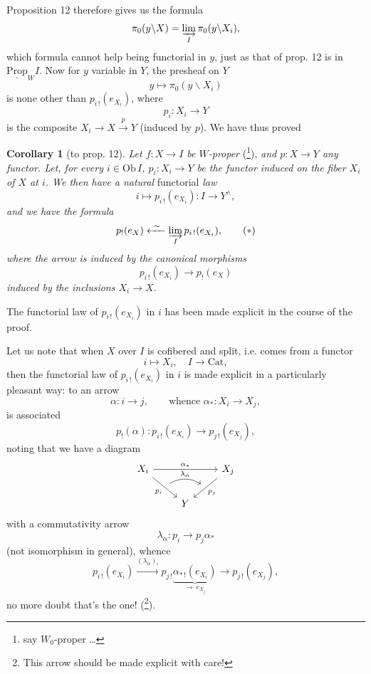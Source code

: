 \documentclass[11pt]{article}
\newcommand{\printedpage}[1]{\marginpar{\footnotesize p.~#1}}
\newcommand{\msp}[1]{\marginpar{\footnotesize [#1]}}
\begin{document}
\msp{page 118}
Proposition 12 therefore gives us the formula
\[
\pi_0(y\backslash X) = \varinjlim_{I} \pi_0(y\backslash X_i),
\]
which formula cannot help being functorial in $y$, just as that of prop. 12 is in $\underline{\mathrm{Prop}}_W I$. Now for $y$ variable in $Y$, the presheaf on $Y$
\[
y \longmapsto \pi_0(y\backslash X_i)
\]
is none other than $p_{i\,!}(e_{X_i})$, where
\[
p_i : X_i \longrightarrow Y
\]
is the composite $X_i \longrightarrow X \xrightarrow{p} Y$ (induced by $p$). We have thus proved

\textbf{Corollary 1} (to prop. 12). \textit{Let $f : X \longrightarrow I$ be $W$-proper} (\footnote[82]{say $W_0$-proper \dots}), \textit{and $p : X \longrightarrow Y$ any functor. Let, for every $i \in \mathrm{Ob}\, I$, $p_i : X_i \longrightarrow Y$ be the functor induced on the fiber $X_i$ of $X$ at $i$. We then have a natural} functorial \textit{law}
\[
i \longmapsto p_{i\,!}(e_{X_i}) : I \longrightarrow Y^\wedge,
\]
\textit{and we have the formula}
\[
p_!(e_X) \xleftarrow{\ \sim\ } \varinjlim_{I} p_{i\,!}(e_{X_i}), \tag*{$(*)$}
\]
\textit{where the arrow is induced by the canonical morphisms}
\[
p_{i\,!}(e_{X_i}) \longrightarrow p_!(e_X)
\]
\printedpage{81}
\msp{page 119}
\textit{induced by the inclusions $X_i \longrightarrow X$.}

The functorial law of $p_{i\,!}(e_{X_i})$ in $i$ has been made explicit in the course of the proof.

Let us note that when $X$ over $I$ is cofibered and split, i.e. comes from a functor
\[
i \longmapsto X_i, \quad I \longrightarrow \mathrm{Cat},
\]
then the functorial law of $p_{i\,!}(e_{X_i})$ in $i$ is made explicit in a particularly pleasant way: to an arrow
\[
\alpha : i \longrightarrow j, \qquad \text{whence } \alpha_* : X_i \longrightarrow X_j,
\]
is associated
\[
p_!(\alpha) : p_{i\,!}(e_{X_i}) \longrightarrow p_{j\,!}(e_{X_j}),
\]
noting that we have a diagram
\[
\begin{tikzcd}
X_i \arrow[rr, "\alpha_*"] \arrow[dr, "p_i"', ""{name=A}] & & X_j \arrow[dl, "p_j", ""'{name=B}] \\
& Y &
\arrow[from=A, to=B, bend left, "\lambda_\alpha"] %
\end{tikzcd}
\]
with a commutativity arrow
\[
\lambda_\alpha : p_i \longrightarrow p_j\alpha_*
\]
(not isomorphism in general), whence
\[
p_{i\,!}(e_{X_i}) \xrightarrow{(\lambda_\alpha)_!} p_{j\,!}\underbrace{\alpha_{*\,!}(e_{X_i})}_{\longrightarrow\, e_{X_j}} \longrightarrow p_{j\,!}(e_{X_j}),
\]
no more doubt that's the one! (\footnote[83]{This arrow should be made explicit with care!}).
\end{document}
